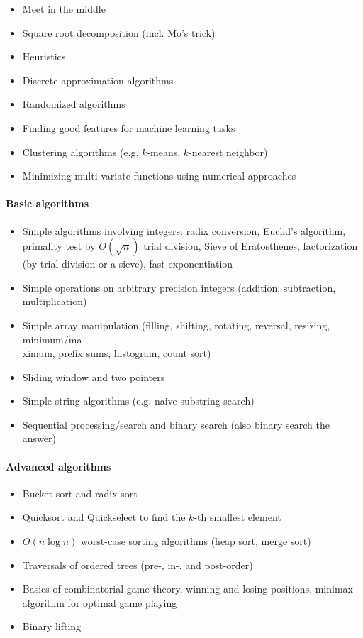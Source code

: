 \documentclass[12pt]{article}
\begin{document}
		\begin{itemize}[label=]
			\item Meet in the middle
			\item Square root decomposition (incl. Mo's trick)
			\item Heuristics
			\item Discrete approximation algorithms
			\item Randomized algorithms
			\item Finding good features for machine learning tasks
			\item Clustering algorithms (e.g. $k$-means, $k$-nearest neighbor)
			\item Minimizing multi-variate functions using numerical approaches
		\end{itemize}
		
		\paragraph{Basic algorithms}
		\begin{itemize}[label=]
			\item Simple algorithms involving integers: radix conversion, Euclid’s algorithm, primality test by $O(\sqrt{n})$ trial division, Sieve of Eratosthenes, factorization (by trial division or a sieve), fast exponentiation
			\item Simple operations on arbitrary precision integers (addition, subtraction, multiplication)
			\item Simple array manipulation (filling, shifting, rotating, reversal, resizing, minimum/ma-\\ximum, prefix sums, histogram, count sort)
			\item Sliding window and two pointers
			\item Simple string algorithms (e.g. naive substring search)
			\item Sequential processing/search and binary search (also binary search the answer)
		\end{itemize}
	
		\paragraph{Advanced algorithms}
		\begin{itemize}[label=]
			\item Bucket sort and radix sort
			\item Quicksort and Quickselect to find the $k$-th smallest element
			\item $O(n\log{n})$ worst-case sorting algorithms (heap sort, merge sort)
			\item Traversals of ordered trees (pre-, in-, and post-order)
			\item Basics of combinatorial game theory, winning and losing positions, minimax algorithm for optimal game playing
			\item Binary lifting
		\end{itemize}
	
\end{document}

